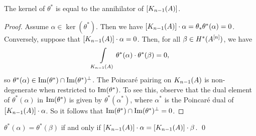 \begin{proposition}\label{annihilator}
The kernel of $\theta^*$ is equal to the annihilator of $[\kum{A}{n-1}]$.
\end{proposition}
\begin{proof}
Assume $\alpha\in \ker(\theta^*)$. Then we have
$
[\kum{A}{n-1}]\cdot \alpha = \theta_*\theta^*(\alpha) = 0
$. 
Conversely, suppose that $ [\kum{A}{n-1}]\cdot \alpha=0$. Then, for all $\beta \in H^*(A\hilb{n})$, we have 
$$
\int\limits_{\kum{A}{n-1}}\theta^*(\alpha)\cdot\theta^*(\beta) = 0,
$$
so $\theta^*(\alpha) \in \im(\theta^*)\cap\im(\theta^*)^\perp$. The Poincar\'e pairing on $\kum{A}{n-1}$ is non-degenerate when restricted to $\im(\theta^*)$. To see this, observe that the dual element of $\theta^*(\alpha)$ in $\im(\theta^*)$ is given by $\theta^*(\alpha^*)$, where $\alpha^* $ is the Poincar\'e dual of $[\kum{A}{n-1}]\cdot \alpha$. So it follows that $\im(\theta^*)\cap\im(\theta^*)^\perp=0$.
\end{proof}
\begin{corollary} \label{KummerEquality}
$\theta^*(\alpha) = \theta^*(\beta)$ if and only if $[\kum{A}{n-1}]\cdot \alpha = [\kum{A}{n-1}]\cdot \beta$. 
\qed
\end{corollary}

